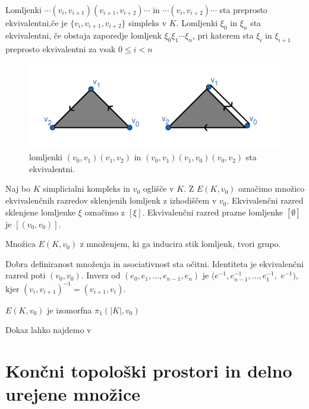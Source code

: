 \documentclass[mat1]{fmfdelo}
\begin{document}
Lomljenki $\cdots(v_i,v_{i+1})(v_{i+1},v_{i+2})\cdots$ in $\cdots(v_i,v_{i+2})\cdots$ sta preprosto ekvivalentni,če je $\{v_i,v_{i+1},v_{i+2}\}$ simpleks v $K$. Lomljenki $\xi_0$ in $\xi_n$ sta ekvivalentni, če obstaja zaporedje lomljenk $\xi_0\xi_1\cdots\xi_n$, pri katerem sta $\xi_i$ in $\xi_{i+1}$ preprosto ekvivalentni za vsak $0\leq i < n$


\begin{figure}[h]
    \centering
    \includegraphics[width=0.9\linewidth]{lomljenki2.png}
    \caption{lomljenki $(v_0,v_1)(v_1,v_2)$ in $(v_0,v_1)(v_1,v_0)(v_0,v_2)$ sta ekvivalentni.}
\end{figure}

    Naj bo $K$ simplicialni kompleks in $v_0$ oglišče v $K$. Z $E(K,v_0)$ označimo množico ekvivalenčnih razredov sklenjenih lomljenk z izhodiščem v $v_0$. Ekvivalenčni razred sklenjene lomljenke $\xi$ označimo z $[\xi]$. Ekvivalenčni razred prazne lomljenke $[\emptyset]$ je $[(v_0,v_0)]$.

    \begin{trditev}
        Množica $E(K,v_0)$ z množenjem, ki ga inducira stik lomljenk, tvori grupo.
    \end{trditev}
\begin{dokaz}
    Dobra definiranost množenja in asociativnost sta očitni. 
    Identiteta je ekvivalenčni razred poti $(v_0,v_0)$. Inverz 
    od $(e_0,e_1,...,e_{n-1},e_n)$ je $(e^{-1},e^{-1}_{n-1},...,e^{-1}_1,$ $e^{-1})$, kjer $(v_i,v_{i+1})^{-1}=(v_{i+1},v_i)$.
\end{dokaz}

\begin{izrek}
    $E(K,v_0)$ je izomorfna $\pi_1(|K|,v_0)$
    \label{iz:grupa lomljenk}
\end{izrek}

Dokaz lahko najdemo v \cite{spanier}

\section{Končni topološki prostori in delno urejene množice}
\label{sec:delne}
\end{document}
